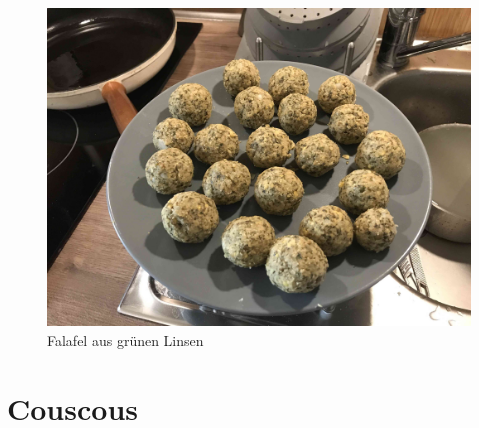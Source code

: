 \documentclass[a4paper, 12pt]{scrbook} 								%
\numberwithin{equation}{section} 									%
\begin{document}
	\begin{figure}
		\centering
		\includegraphics[width = \textwidth]{media/Falafel.JPG}
		\caption{Falafel aus grünen Linsen}
	\end{figure}
	\newpage


	\section{Couscous}
\end{document}
